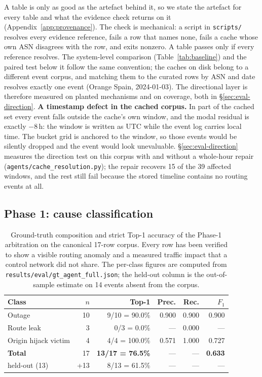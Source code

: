 A table is only as good as the artefact behind it, so we state the
artefact for every table and what the evidence check returns on it
(Appendix~\ref{app:provenance}). The check is mechanical: a script in
\texttt{scripts/} resolves every evidence reference, fails a row that names
none, fails a cache whose own ASN disagrees with the row, and exits
nonzero. A table passes only if every reference resolves. The
system-level comparison (Table~\ref{tab:baseline}) and the paired test
below it follow the same convention; the caches on disk belong to a
different event corpus, and matching them to the curated rows by ASN and
date resolves exactly one event (Orange Spain, 2024-01-03). The
directional layer is therefore measured on planted mechanisms and on
coverage, both in \S\ref{sec:eval-direction}.
\textbf{A timestamp defect in the cached corpus.} In part of the cached
set every event falls outside the cache's own window, and the modal residual
is exactly $-8$\,h: the window is written as UTC while the event log
carries local time. The bucket grid is anchored to the window, so those
events would be silently dropped and the event would look unevaluable.
\S\ref{sec:eval-direction} measures the direction test on this corpus with
and without a whole-hour repair (\texttt{agents/cache\_resolution.py}); the
repair recovers 15 of the 39 affected windows, and the rest still fail
because the stored timeline contains no routing events at all.

\subsection{Phase 1: cause classification}
\label{sec:eval-cause}

\begin{table}[t]
\centering
\caption{Ground-truth composition and strict Top-1 accuracy of the
Phase-1 arbitration on the canonical 17-row corpus. Every row has been
verified to show a visible routing anomaly and a measured traffic impact
that a control network did not share. The per-class figures are computed
from \texttt{results/eval/gt\_agent\_full.json}; the held-out column is
the out-of-sample estimate on 14 events absent from the corpus.}
\label{tab:dataset}
\footnotesize
\setlength{\tabcolsep}{4pt}
\begin{tabular}{l r r r r r}
\hline
\textbf{Class} & \textbf{$n$} & \textbf{Top-1} & \textbf{Prec.} & \textbf{Rec.} & \textbf{$F_1$} \\
\hline
Outage               & 10 & 9/10 = 90.0\% & 0.900 & 0.900 & 0.900 \\
Route leak           &  3 & 0/3  =  0.0\% & ---   & 0.000 & ---   \\
Origin hijack victim &  4 & 4/4  = 100.0\% & 0.571 & 1.000 & 0.727 \\
\hline
\textbf{Total}                & 17 & \textbf{13/17 = 76.5\%} & --- & --- & \textbf{0.633}\\
\hline
held-out (13)     & +13 & 8/13 = 61.5\% & --- & --- & ---   \\
\hline
\end{tabular}
\end{table}

